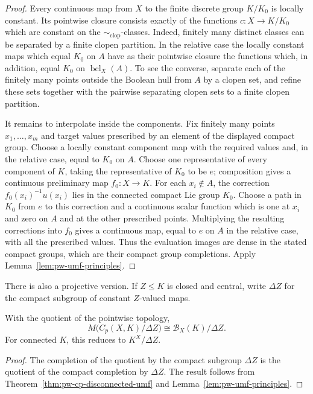 \begin{proof}
Every continuous map from \(X\) to the finite discrete group \(K/K_0\) is
locally constant. Its pointwise closure consists exactly of the functions
\(c:X\to K/K_0\) which are constant on the
\(\sim_{\mathrm{clop}}\)-classes.
Indeed, finitely many distinct classes can be separated by a finite clopen
partition. In the relative case the locally constant maps which equal \(K_0\)
on \(A\) have as their pointwise closure the functions which, in addition,
equal \(K_0\) on \(\operatorname{bcl}_X(A)\). To see the converse, separate
each of the finitely many points outside the Boolean hull from \(A\) by a
clopen set, and refine these sets together with the pairwise separating
clopen sets to a finite clopen partition.

It remains to interpolate inside the components. Fix finitely many points
\(x_1,\ldots,x_m\) and target values prescribed by an element of the displayed
compact group. Choose a locally constant component map with the required
values and, in the relative case, equal to \(K_0\) on \(A\). Choose one
representative of every component of \(K\), taking the representative of
\(K_0\) to be \(e\); composition gives a continuous preliminary map
\(f_0:X\to K\). For each \(x_i\notin A\), the correction
\(f_0(x_i)^{-1}u(x_i)\) lies in the connected compact Lie group \(K_0\).
Choose a path in \(K_0\) from \(e\) to this correction and a continuous scalar
function which is one at \(x_i\) and zero on \(A\) and at the other prescribed
points. Multiplying the resulting corrections into \(f_0\) gives a continuous
map, equal to \(e\) on \(A\) in the relative case, with all the prescribed
values. Thus the evaluation images are dense in the stated compact groups,
which are their compact group completions. Apply
Lemma~\ref{lem:pw-umf-principles}.
\end{proof}

There is also a projective version. If \(Z\leq K\) is closed and central,
write \(\Delta Z\) for the compact subgroup of constant \(Z\)-valued maps.

\begin{corollary}\label{cor:pw-projective-cp-umf}
With the quotient of the pointwise topology,
\[
 M\bigl(C_p(X,K)/\Delta Z\bigr)
 \cong \mathcal B_X(K)/\Delta Z.
\]
For connected \(K\), this reduces to \(K^X/\Delta Z\).
\end{corollary}

\begin{proof}
The completion of the quotient by the compact subgroup \(\Delta Z\) is the
quotient of the compact completion by \(\Delta Z\). The result follows from
Theorem~\ref{thm:pw-cp-disconnected-umf} and
Lemma~\ref{lem:pw-umf-principles}.
\end{proof}


